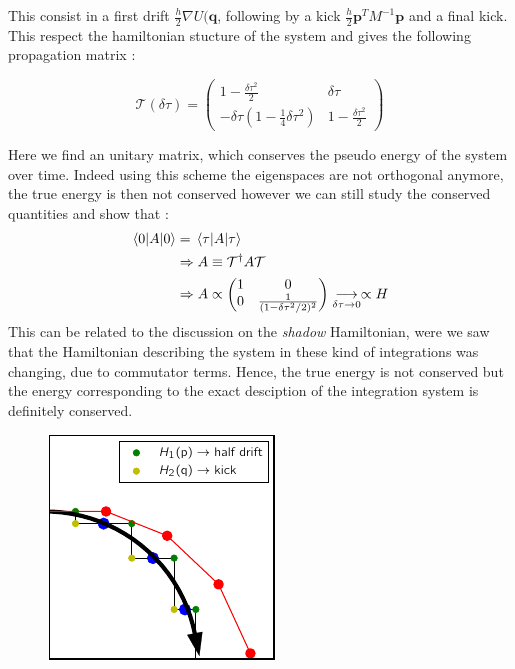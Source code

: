 \documentclass[ansiapaper]{report}
\begin{document}
\begin{multicols}{3}
	This consist in a first drift $\frac{h}{2} \nabla U(\textbf{q}$, following by a kick  $\frac{h}{2}\textbf{p} ^TM^{-1}\textbf{p}$ and a final kick. This respect the hamiltonian stucture of the system and gives the following  propagation matrix :

	$$
		\mathcal{T}(\delta \tau) = \begin{pmatrix}
			1 - \frac{\delta \tau^2}{2}                             & \delta \tau                 \\
			-\delta \tau \left(1 - \frac{1}{4} \delta \tau^2\right) & 1 - \frac{\delta \tau^2}{2}
		\end{pmatrix}
	$$

	Here we find an unitary matrix, which conserves the pseudo energy of the system over time. Indeed using this scheme the eigenspaces are not orthogonal anymore, the true energy is then not conserved however we can still study the conserved quantities and show that :
	\begin{align*}
		\expval{A}{0} & = \expval{A}{\tau}
		\\ & \Rightarrow A \equiv \mathcal{T}^\dagger A \mathcal{T}
		\\ & \Rightarrow A \propto \begin{pmatrix}
			1 & 0                                 \\
			0 & \frac{1}{(1 - \delta \tau^2/2)^2}
		\end{pmatrix}\underset{\delta \tau \rightarrow 0}{\longrightarrow} \propto H
	\end{align*}
	This can be related to the discussion on the \textit{shadow} Hamiltonian, were we saw that the Hamiltonian describing the system in these kind of integrations was changing, due to commutator terms. Hence, the true energy is not conserved but the energy corresponding to the exact desciption of the integration system is definitely conserved.
	\begin{figure}[H]
		\centering
		\includegraphics[width=1\linewidth]{./figures/Velvet_euler.pdf}

\end{figure}
\end{multicols}
\end{document}
